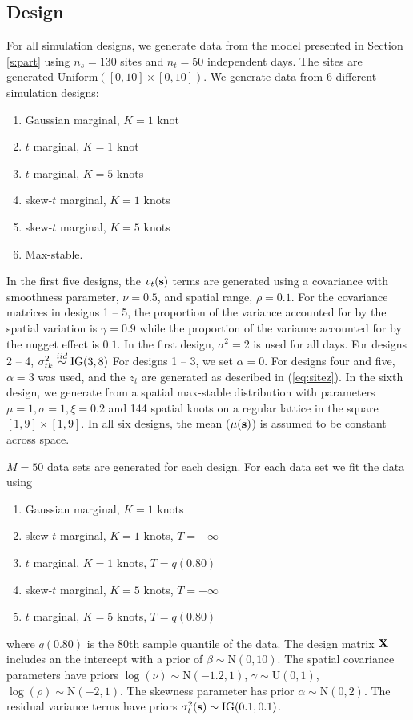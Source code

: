\documentclass[11pt]{article}
\begin{document}
\subsection{Design}\label{s:simdesign}
For all simulation designs, we generate data from the model presented in Section \ref{s:part} using $n_s=130$ sites and $n_t=50$ independent days.
The sites are generated Uniform$([0, 10] \times [0, 10])$.
We generate data from 6 different simulation designs:
\begin{enumerate} \setlength{\itemsep}{-0.5em}
  \item Gaussian marginal, $K=1$ knot
  \item $t$ marginal, $K=1$ knot
  \item $t$ marginal, $K=5$ knots
  \item skew-$t$ marginal, $K=1$ knots
  \item skew-$t$ marginal, $K=5$ knots
  \item Max-stable.
\end{enumerate}
In the first five designs, the $v_t(\mbox{\bf s})$ terms are generated using a \Matern covariance with smoothness parameter, $\nu = 0.5$, and spatial range, $\rho = 0.1$.
For the covariance matrices in designs 1 -- 5, the proportion of the variance accounted for by the spatial variation is $\gamma = 0.9$ while the proportion of the variance accounted for by the nugget effect is $0.1$.
In the first design, $\sigma^2 = 2$ is used for all days.
For designs 2 -- 4, $\sigma^2_{tk} \stackrel{iid}{\sim} \text{IG}(3, 8)$
For designs 1 -- 3, we set $\alpha = 0$.
For designs four and five, $\alpha = 3$ was used, and the $z_t$ are generated as described in (\ref{eq:sitez}).
In the sixth design, we generate from a spatial max-stable distribution \citep{Reich2012} with parameters $\mu = 1, \sigma=1, \xi=0.2$ and 144 spatial knots on a regular lattice in the square $[1, 9] \times [1, 9]$.
In all six designs, the mean ($\mu(\mbox{\bf s})$) is assumed to be constant across space.

$M = 50$ data sets are generated for each design.
For each data set we fit the data using
\begin{enumerate} \setlength{\itemsep}{-0.5em}
  \item Gaussian marginal, $K=1$ knots
  \item skew-$t$ marginal, $K=1$ knots, $T=-\infty$
  \item $t$ marginal, $K=1$ knots, $T=q(0.80)$
  \item skew-$t$ marginal, $K=5$ knots, $T=-\infty$
  \item $t$ marginal, $K=5$ knots, $T=q(0.80)$
\end{enumerate}
where $q(0.80)$ is the 80th sample quantile of the data.
The design matrix $\mbox{\bf X}$ includes an the intercept with a prior of $\beta \sim \text{N}(0, 10)$.
The spatial covariance parameters have priors $\log(\nu) \sim \text{N}(-1.2, 1)$, $\gamma \sim \text{U}(0, 1)$, $\log(\rho) \sim \text{N}(-2, 1)$.
The skewness parameter has prior $\alpha \sim \text{N}(0, 2)$.
The residual variance terms have priors $\sigma^2_t(\mbox{\bf s}) \sim \text{IG}(0.1, 0.1)$.
\end{document}
